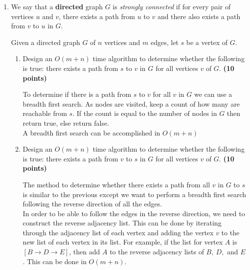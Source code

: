 \documentclass[11pt]{article}
\begin{document}
\begin{enumerate}
  \item %

We say that a {\bf directed} graph $G$ is {\em strongly connected} if for every pair of vertices $u$ and $v$, there exists a path from $u$ to $v$ and there also exists a path from $v$ to $u$ in $G$.

Given a directed graph $G$ of $n$ vertices and $m$ edges, let $s$ be a vertex of $G$.

\begin{enumerate}
  \item %
Design an $O(m+n)$ time algorithm to determine whether the following is true: there exists a path from $s$ to $v$ in $G$ for all vertices $v$ of $G$. {\hfill \bf (10 points)}

\begin{tcolorbox}

  To determine if there is a path from $s$ to $v$ for all $v$ in $G$ we can use
  a breadth first search. As nodes are visited, keep a count of how many are
  reachable from $s$. If the count is equal to the number of nodes in $G$ then
  return true, else return false.\\

  A breadth first search can be accomplished in $O(m+n)$

\end{tcolorbox}

  \item %
Design an $O(m+n)$ time algorithm to determine whether the following is true: there exists a path from $v$ to $s$ in $G$ for all vertices $v$ of $G$. {\hfill \bf (10 points)}

\begin{tcolorbox}

  The method to determine whether there exists a path from all $v$ in $G$ to $s$
  is similar to the previous except we want to perform a breadth first search
  following the reverse direction of all the edges.\\

  In order to be able to follow the edges in the reverse direction, we need to
  construct the reverse adjacency list. This can be done by iterating through
  the adjacency list of each vertex and adding the vertex $v$ to the new list of
  each vertex in its list. For example, if the list for vertex $A$ is
  $[B \rightarrow D \rightarrow E]$, then add $A$ to the reverse adjacency lists
  of $B,\ D,$ and $E$. This can be done in $O(m+n)$.\\


\end{tcolorbox}
\end{enumerate}
\end{enumerate}
\end{document}
